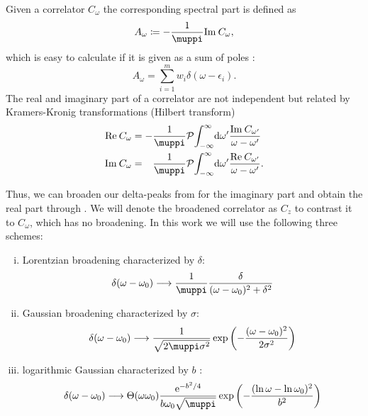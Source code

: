 Given a correlator $C_\omega$ the corresponding spectral part is defined as
\begin{equation}
    A_\omega \coloneq -\frac{1}{\muppi}\Im C_\omega,
\end{equation}
which is easy to calculate if it is given as a sum of poles :
\begin{equation}
    A_\omega = \sum_{i=1}^m w_i \delta(\omega - \epsilon_i).
    \label{eq:spectral-sum}
\end{equation}
The real and imaginary part of a correlator are not independent
but related by Kramers-Kronig transformations (Hilbert transform)
\begin{subequations}
    \begin{align}
        \Re C_\omega
         & =
        - \frac{1}{\muppi} \mathcal{P}\! \int_{-\infty}^\infty\! \md\omega'
        \frac{\Im C_{\omega'}}{\omega - \omega'}
        \label{eq:kramers-kroneg-real} \\
        \Im C_\omega
         & =
        \phantom{-} \frac{1}{\muppi} \mathcal{P}\! \int_{-\infty}^\infty\! \md\omega'
        \frac{\Re C_{\omega'}}{\omega - \omega'}.
        \label{eq:kramers-kronig-imag}
    \end{align}
\end{subequations}

Thus, we can broaden our delta-peaks from 
for the imaginary part and obtain the real part through .
We will denote the broadened correlator as $C_z$
to contrast it to $C_\omega$, which has no broadening.
In this work we will use the following three schemes:
\begin{enumerate}[(i)]
    \item Lorentzian broadening characterized by $\delta$:
          \label{item:lorentzian}
          \begin{equation}
              \delta(\omega - \omega_0)
              \longrightarrow
              \frac{1}{\muppi}\frac{\delta}{(\omega - \omega_0)^2 + \delta^2}
          \end{equation}
    \item Gaussian broadening characterized by $\sigma$:
          \label{item:gaussian}
          \begin{equation}
              \delta(\omega - \omega_0)
              \longrightarrow
              \frac{1}{\sqrt{2\muppi \sigma^2}}\exp\left(-\frac{(\omega - \omega_0)^2}{2\sigma^2}\right)
          \end{equation}
    \item logarithmic Gaussian characterized by $b$ \cite{Bulla2008}:
          \label{item:logarithmic-gaussian}
          \begin{equation}
              \delta(\omega - \omega_0)
              \longrightarrow
              \Theta(\omega\omega_0)\frac{\me^{-b^2/4}}{b\omega_0\sqrt{\muppi}}\exp\left(-\frac{(\ln\omega-\ln\omega_0)^2}{b^2}\right)
          \end{equation}
\end{enumerate}


